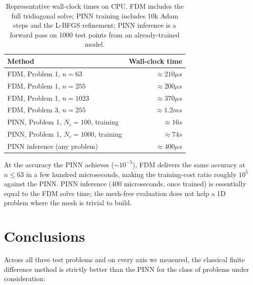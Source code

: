 \documentclass[11pt]{article}
\theoremstyle{plain}
\theoremstyle{remark}
\begin{document}
\begin{table}[h]
\centering
\begin{tabular}{lr}
\toprule
\textbf{Method} & \textbf{Wall-clock time} \\
\midrule
FDM, Problem 1, $n = 63$      & $\approx 210 \mu s$ \\
FDM, Problem 1, $n = 255$     & $\approx 200 \mu s$ \\
FDM, Problem 1, $n = 1023$    & $\approx 370 \mu s$ \\
FDM, Problem 3, $n = 255$     & $\approx 1.2 ms$ \\
PINN, Problem 1, $N_c = 100$, training & $\approx 16 s$ \\
PINN, Problem 1, $N_c = 1000$, training & $\approx 74 s$ \\
PINN inference (any problem) & $\approx 400 \mu s$ \\
\bottomrule
\end{tabular}
\caption{Representative wall-clock times on CPU. FDM includes the full
         tridiagonal solve; PINN training includes 10k Adam steps and
         the L-BFGS refinement; PINN inference is a forward pass on
         1000 test points from an already-trained model.}
\label{tab:timing}
\end{table}

At the accuracy the PINN achieves ($\sim 10^{-5}$), FDM delivers the
same accuracy at $n \le 63$ in a few hundred microseconds, making the
training-cost ratio roughly $10^5$ against the PINN. PINN inference
(400 microseconds, once trained) is essentially equal to the FDM solve
time; the mesh-free evaluation does not help a 1D problem where the
mesh is trivial to build.


\section{Conclusions}
\label{sec:conclusions}

Across all three test problems and on every axis we measured, the classical
finite difference method is strictly better than the PINN for the class of
problems under consideration:
\end{document}
